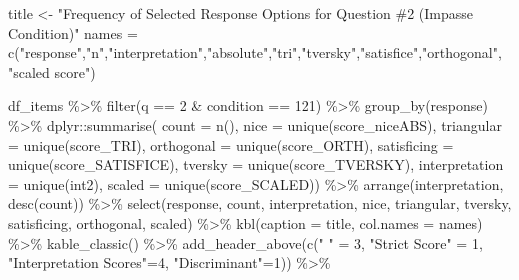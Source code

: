\documentclass[
  letterpaper,
  DIV=11,
  numbers=noendperiod]{scrreprt}
\newenvironment{Shaded}{\begin{snugshade}}{\end{snugshade}}
\newcommand{\AttributeTok}[1]{\textcolor[rgb]{0.40,0.45,0.13}{#1}}
\newcommand{\DecValTok}[1]{\textcolor[rgb]{0.68,0.00,0.00}{#1}}
\newcommand{\FunctionTok}[1]{\textcolor[rgb]{0.28,0.35,0.67}{#1}}
\newcommand{\NormalTok}[1]{\textcolor[rgb]{0.00,0.23,0.31}{#1}}
\newcommand{\OtherTok}[1]{\textcolor[rgb]{0.00,0.23,0.31}{#1}}
\newcommand{\SpecialCharTok}[1]{\textcolor[rgb]{0.37,0.37,0.37}{#1}}
\newcommand{\StringTok}[1]{\textcolor[rgb]{0.13,0.47,0.30}{#1}}
\begin{document}
\begin{Shaded}
\begin{Highlighting}[]
\NormalTok{title }\OtherTok{\textless{}{-}} \StringTok{"Frequency of Selected Response Options for Question \#2 (Impasse Condition)"}
\NormalTok{names }\OtherTok{=} \FunctionTok{c}\NormalTok{(}\StringTok{"response"}\NormalTok{,}\StringTok{"n"}\NormalTok{,}\StringTok{"interpretation"}\NormalTok{,}\StringTok{"absolute"}\NormalTok{,}\StringTok{"tri"}\NormalTok{,}\StringTok{"tversky"}\NormalTok{,}\StringTok{"satisfice"}\NormalTok{,}\StringTok{"orthogonal"}\NormalTok{, }\StringTok{"scaled score"}\NormalTok{)}

\NormalTok{df\_items }\SpecialCharTok{\%\textgreater{}\%} \FunctionTok{filter}\NormalTok{(q }\SpecialCharTok{==} \DecValTok{2} \SpecialCharTok{\&}\NormalTok{ condition }\SpecialCharTok{==} \DecValTok{121}\NormalTok{) }\SpecialCharTok{\%\textgreater{}\%} \FunctionTok{group\_by}\NormalTok{(response) }\SpecialCharTok{\%\textgreater{}\%} 
\NormalTok{  dplyr}\SpecialCharTok{::}\FunctionTok{summarise}\NormalTok{( }\AttributeTok{count =} \FunctionTok{n}\NormalTok{(), }
                    \AttributeTok{nice =} \FunctionTok{unique}\NormalTok{(score\_niceABS),}
                    \AttributeTok{triangular =} \FunctionTok{unique}\NormalTok{(score\_TRI), }
                    \AttributeTok{orthogonal =}  \FunctionTok{unique}\NormalTok{(score\_ORTH),}
                    \AttributeTok{satisficing =}  \FunctionTok{unique}\NormalTok{(score\_SATISFICE),}
                    \AttributeTok{tversky =} \FunctionTok{unique}\NormalTok{(score\_TVERSKY),}
                    \AttributeTok{interpretation =} \FunctionTok{unique}\NormalTok{(int2),}
                    \AttributeTok{scaled =} \FunctionTok{unique}\NormalTok{(score\_SCALED)) }\SpecialCharTok{\%\textgreater{}\%} 
  \FunctionTok{arrange}\NormalTok{(interpretation, }\FunctionTok{desc}\NormalTok{(count)) }\SpecialCharTok{\%\textgreater{}\%} 
  \FunctionTok{select}\NormalTok{(response, count, interpretation, nice, }
\NormalTok{         triangular, tversky, satisficing, orthogonal, scaled) }\SpecialCharTok{\%\textgreater{}\%} 
  \FunctionTok{kbl}\NormalTok{(}\AttributeTok{caption =}\NormalTok{ title, }\AttributeTok{col.names =}\NormalTok{ names) }\SpecialCharTok{\%\textgreater{}\%}  \FunctionTok{kable\_classic}\NormalTok{() }\SpecialCharTok{\%\textgreater{}\%} 
  \FunctionTok{add\_header\_above}\NormalTok{(}\FunctionTok{c}\NormalTok{(}\StringTok{" "} \OtherTok{=} \DecValTok{3}\NormalTok{, }\StringTok{"Strict Score"} \OtherTok{=} \DecValTok{1}\NormalTok{, }\StringTok{"Interpretation Scores"}\OtherTok{=}\DecValTok{4}\NormalTok{, }\StringTok{"Discriminant"}\OtherTok{=}\DecValTok{1}\NormalTok{)) }\SpecialCharTok{\%\textgreater{}\%}

\end{Highlighting}
\end{Shaded}
\end{document}
